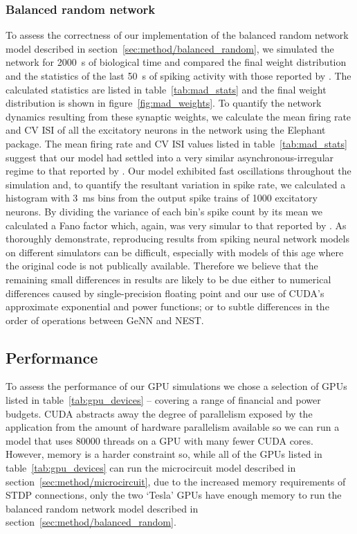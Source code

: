 \documentclass[utf8]{frontiersSCNS} %
\begin{document}
\subsubsection{Balanced random network}
To assess the correctness of our implementation of the balanced random network model described in section~\ref{sec:method/balanced_random}, we simulated the network for \SI{2000}{\second} of biological time and compared the final weight distribution and the statistics of the last \SI{50}{\second} of spiking activity with those reported by \citet{Morrison2007}.
The calculated statistics are listed in table~\ref{tab:mad_stats} and the final weight distribution is shown in figure~\ref{fig:mad_weights}.
To quantify the network dynamics resulting from these synaptic weights, we calculate the mean firing rate and CV ISI of all the excitatory neurons in the network using the Elephant~\citep{Yegenoglu2018} package.
The mean firing rate and CV ISI values listed in table~\ref{tab:mad_stats} suggest that our model had settled into a very similar asynchronous-irregular regime to that reported by \citeauthor{Morrison2007}.
Our model exhibited fast oscillations throughout the simulation and, to quantify the resultant variation in spike rate, we calculated a histogram with \SI{3}{\milli\second} bins from the output spike trains of \num{1000} excitatory neurons.
By dividing the variance of each bin's spike count by its mean we calculated a Fano factor which, again, was very simular to that reported by \citeauthor{Morrison2007}.
As \citet{Pauli2018} thoroughly demonstrate, reproducing results from spiking neural network models on different simulators can be difficult, especially with models of this age where the original code is not publically available.
Therefore we believe that the remaining small differences in results are likely to be due either to numerical differences caused by single-precision floating point and our use of CUDA's approximate exponential and power functions; or to subtle differences in the order of operations between GeNN and NEST.

\subsection{Performance}
\label{sec:results/performance}
To assess the performance of our GPU simulations we chose a selection of GPUs listed in table~\ref{tab:gpu_devices} -- covering a range of financial and power budgets.
CUDA abstracts away the degree of parallelism exposed by the application from the amount of hardware parallelism available so we can run a model that uses \num{80000} threads on a GPU with many fewer CUDA cores.
However, memory is a harder constraint so, while all of the GPUs listed in table~\ref{tab:gpu_devices} can run the microcircuit model described in section~\ref{sec:method/microcircuit}, due to the increased memory requirements of STDP connections, only the two `Tesla' GPUs have enough memory to run the balanced random network model described in section~\ref{sec:method/balanced_random}.
\end{document}
